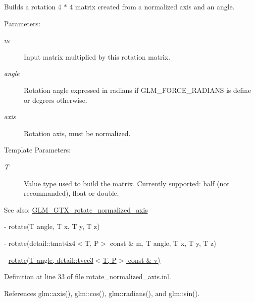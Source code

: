 Builds a rotation 4 $\ast$ 4 matrix created from a normalized axis and an angle.

\begin{Desc}
\item[Parameters:]
\begin{description}
\item[{\em m}]Input matrix multiplied by this rotation matrix. \item[{\em angle}]Rotation angle expressed in radians if GLM\_\-FORCE\_\-RADIANS is define or degrees otherwise. \item[{\em axis}]Rotation axis, must be normalized. \end{description}
\end{Desc}
\begin{Desc}
\item[Template Parameters:]
\begin{description}
\item[{\em T}]Value type used to build the matrix. Currently supported: half (not recommanded), float or double.\end{description}
\end{Desc}
\begin{Desc}
\item[See also:]\hyperlink{group__gtx__rotate__normalized__axis}{GLM\_\-GTX\_\-rotate\_\-normalized\_\-axis} 

- rotate(T angle, T x, T y, T z) 

- rotate(detail::tmat4x4$<$T, P$>$ const \& m, T angle, T x, T y, T z) 

- \hyperlink{group__gtx__transform_g52e753e0ad1cb6ae700855cc9ca921ca}{rotate(T angle, detail::tvec3$<$T, P$>$ const \& v)} \end{Desc}


Definition at line 33 of file rotate\_\-normalized\_\-axis.inl.

References glm::axis(), glm::cos(), glm::radians(), and glm::sin().

